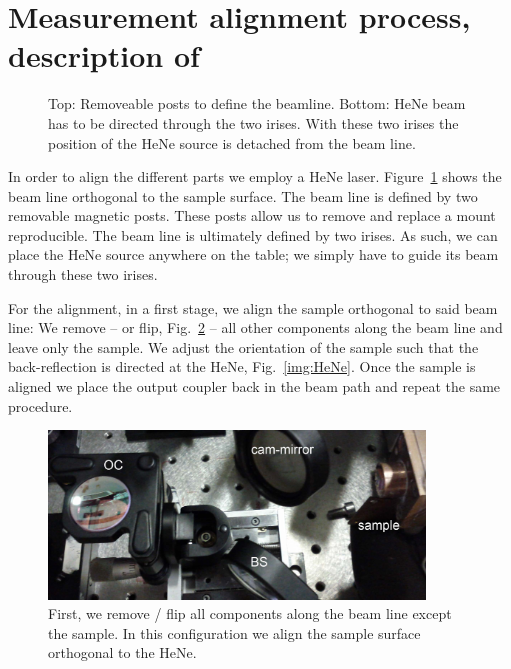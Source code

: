 \section{Measurement alignment process, description of}
\label{sec:alignment}

\begin{figure}
\centering
{}
\caption{Top: Removeable posts to define the beamline.
Bottom: HeNe beam has to be directed through the two irises.
With these two irises the position of the HeNe source is detached from the beam line.}
\label{img:beamline}
\end{figure}

In order to align the different parts we employ a HeNe laser.
Figure~\ref{img:beamline} shows the beam line orthogonal to the sample surface.
The beam line is defined by two removable magnetic posts.
These posts allow us to remove and replace a mount reproducible.
The beam line is ultimately defined by two irises.
As such, we can place the HeNe source anywhere on the table;
we simply have to guide its beam through these two irises.

For the alignment,
in a first stage,
we align the sample orthogonal to said beam line:
We remove -- or flip, Fig.~\ref{img:cavity_flipped} --
all other components along the beam line
and leave only the sample.
We adjust the orientation of the sample such that
the back-reflection is directed at the HeNe, Fig.~\ref{img:HeNe}.
Once the sample is aligned
we place the output coupler
back in the beam path
and repeat the same procedure.

\begin{figure}
\centering
\includegraphics[width=10cm]{img/cavity_flipped.jpg}
\caption{First, we remove / flip all components along the beam line except the sample.
In this configuration we align the sample surface orthogonal to the HeNe.}
\label{img:cavity_flipped}
\end{figure}

